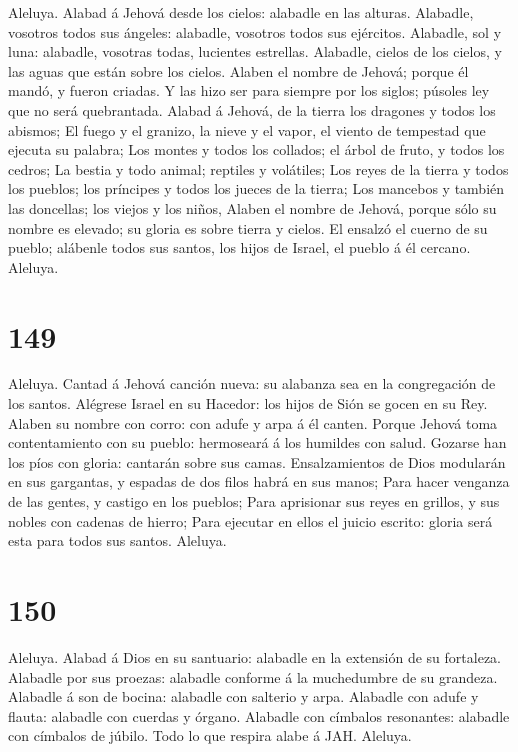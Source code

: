  Aleluya. Alabad á Jehová desde los cielos: alabadle en
las alturas.  Alabadle, vosotros todos sus ángeles:
alabadle, vosotros todos sus ejércitos.  Alabadle, sol y
luna: alabadle, vosotras todas, lucientes estrellas. 
Alabadle, cielos de los cielos, y las aguas que están sobre los cielos.
 Alaben el nombre de Jehová; porque él mandó, y fueron
criadas.  Y las hizo ser para siempre por los siglos;
púsoles ley que no será quebrantada.  Alabad á Jehová, de
la tierra los dragones y todos los abismos;  El fuego y el
granizo, la nieve y el vapor, el viento de tempestad que ejecuta su
palabra;  Los montes y todos los collados; el árbol de
fruto, y todos los cedros;  La bestia y todo animal;
reptiles y volátiles;  Los reyes de la tierra y todos los
pueblos; los príncipes y todos los jueces de la tierra; 
Los mancebos y también las doncellas; los viejos y los niños,
 Alaben el nombre de Jehová, porque sólo su nombre es
elevado; su gloria es sobre tierra y cielos.  El ensalzó
el cuerno de su pueblo; alábenle todos sus santos, los hijos de Israel,
el pueblo á él cercano. Aleluya.

\hypertarget{section-148}{%
\section{149}\label{section-148}}

 Aleluya. Cantad á Jehová canción nueva: su alabanza sea
en la congregación de los santos.  Alégrese Israel en su
Hacedor: los hijos de Sión se gocen en su Rey.  Alaben su
nombre con corro: con adufe y arpa á él canten.  Porque
Jehová toma contentamiento con su pueblo: hermoseará á los humildes con
salud.  Gozarse han los píos con gloria: cantarán sobre
sus camas.  Ensalzamientos de Dios modularán en sus
gargantas, y espadas de dos filos habrá en sus manos; 
Para hacer venganza de las gentes, y castigo en los pueblos;
 Para aprisionar sus reyes en grillos, y sus nobles con
cadenas de hierro;  Para ejecutar en ellos el juicio
escrito: gloria será esta para todos sus santos. Aleluya.

\hypertarget{section-149}{%
\section{150}\label{section-149}}

 Aleluya. Alabad á Dios en su santuario: alabadle en la
extensión de su fortaleza.  Alabadle por sus proezas:
alabadle conforme á la muchedumbre de su grandeza. 
Alabadle á son de bocina: alabadle con salterio y arpa. 
Alabadle con adufe y flauta: alabadle con cuerdas y órgano.
 Alabadle con címbalos resonantes: alabadle con címbalos
de júbilo.  Todo lo que respira alabe á JAH. Aleluya.
